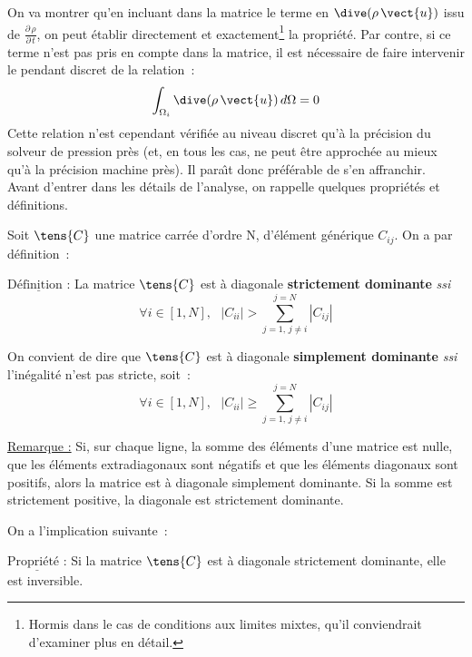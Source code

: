 On va montrer qu'en incluant
dans la matrice le terme en $\dive(\rho \,\vect{u})$
issu de $\displaystyle \frac {{\partial}\,\rho}{{\partial}\,t}$, on peut
\'etablir directement et exactement\footnote{Hormis
dans le cas de conditions aux limites mixtes, qu'il conviendrait d'examiner plus
en d\'etail.} la propri\'et\'e. Par contre, si ce terme n'est pas pris en compte dans la matrice,
il est n\'ecessaire de faire intervenir le pendant discret de la relation~:
\begin{equation}\label{Base_Covofi_Eq_Div_Int}
\displaystyle \int_{\Omega_i} \dive (\rho\,\vect{u})\, d\Omega = 0
\end{equation}
Cette relation n'est cependant v\'erifi\'ee au niveau discret qu'\`a la pr\'ecision du
solveur de pression pr\`es (et, en tous les cas, ne peut \^etre approch\'ee au
mieux
qu'\`a la pr\'ecision machine pr\`es). Il para\^\i t donc pr\'ef\'erable de s'en
affranchir. \\


Avant d'entrer dans les d\'etails de l'analyse, on rappelle quelques
propri\'et\'es et d\'efinitions.

Soit $\tens{C}$ une matrice carr\'ee d'ordre N,
d'\'el\'ement g\'en\'erique $C_{ij}$. On a par d\'efinition~:

$\underline{\text{D\'efinition~:}}$
La matrice $\tens{C}$ est \`{a} diagonale {\bf strictement dominante} {\it ssi}
\begin{equation}\label{Base_Covofi_Eq_Propriete_1}
\forall i \in [1,N],\ \ \ |C_{ii}| > \sum\limits_{j=1,\,j\neq i}^{j=N}|C_{ij}|
\end{equation}

On convient de dire que  $\tens{C}$ est \`{a} diagonale {\bf simplement dominante} {\it
ssi} l'in\'egalit\'e n'est pas stricte, soit~:
\begin{equation}
\forall i \in [1,N],\ \ \ |C_{ii}| \geqslant \sum\limits_{j=1,\,j\neq i}^{j=N}|C_{ij}|
\end{equation}

\underline{Remarque :} Si, sur chaque ligne, la somme des \'el\'ements d'une
matrice est nulle, que les \'el\'ements extradiagonaux sont
n\'egatifs et que les \'el\'ements diagonaux sont positifs, alors la matrice est
\`a diagonale simplement dominante. Si la somme est strictement positive, la
diagonale est strictement dominante.

On a l'implication suivante~:

$\underline{\text{Propri\'et\'e~:}}$
Si la matrice $\tens{C}$ est \`{a} diagonale strictement dominante, elle est
inversible. \\

